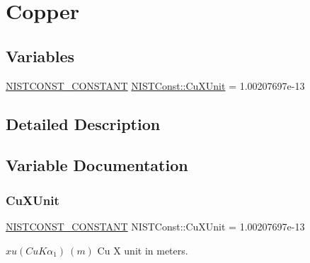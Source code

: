\hypertarget{group___n_i_s_t_const-_copper}{}\section{Copper}
\label{group___n_i_s_t_const-_copper}
\subsection*{Variables}
\begin{DoxyCompactItemize}
\item 
\mbox{\hyperlink{group___n_i_s_t_const-_macros_ga2b0fc1d7452373f816175dd86ce26729}{N\+I\+S\+T\+C\+O\+N\+S\+T\+\_\+\+C\+O\+N\+S\+T\+A\+NT}} \mbox{\hyperlink{group___n_i_s_t_const-_copper_ga22d8010195e8b2c21fc1be6ae608c139}{N\+I\+S\+T\+Const\+::\+Cu\+X\+Unit}} = 1.\+00207697e-\/13
\end{DoxyCompactItemize}


\subsection{Detailed Description}


\subsection{Variable Documentation}
\mbox{\label{group___n_i_s_t_const-_copper_ga22d8010195e8b2c21fc1be6ae608c139}} 
\subsubsection{\texorpdfstring{Cu\+X\+Unit}{CuXUnit}}
{\footnotesize\ttfamily \mbox{\hyperlink{group___n_i_s_t_const-_macros_ga2b0fc1d7452373f816175dd86ce26729}{N\+I\+S\+T\+C\+O\+N\+S\+T\+\_\+\+C\+O\+N\+S\+T\+A\+NT}} N\+I\+S\+T\+Const\+::\+Cu\+X\+Unit = 1.\+00207697e-\/13}

$xu(CuK\alpha_1) \ (m)$ Cu X unit in meters. 